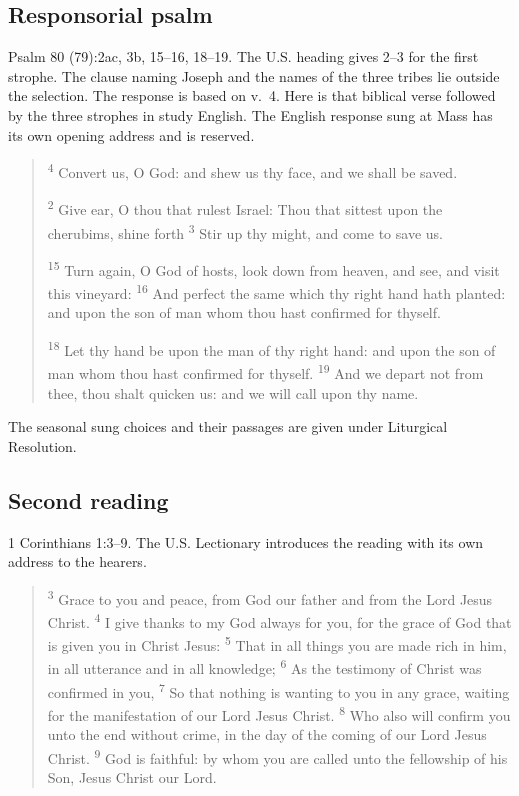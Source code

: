 \subsection{Responsorial psalm}
\label{proper-psalm}
Psalm 80 (79):2ac, 3b, 15--16, 18--19. The U.S. heading gives 2--3 for the first strophe. The clause naming Joseph and the names of the three tribes lie outside the selection. The response is based on v.~4. Here is that biblical verse followed by the three strophes in study English. The English response sung at Mass has its own opening address and is reserved.
\begin{quote}
\textsuperscript{4} Convert us, O God: and shew us thy face, and we shall be saved.

\textsuperscript{2} Give ear, O thou that rulest Israel: Thou that sittest upon the cherubims, shine forth
\textsuperscript{3} Stir up thy might, and come to save us.

\textsuperscript{15} Turn again, O God of hosts, look down from heaven, and see, and visit this vineyard:
\textsuperscript{16} And perfect the same which thy right hand hath planted: and upon the son of man whom thou hast confirmed for thyself.

\textsuperscript{18} Let thy hand be upon the man of thy right hand: and upon the son of man whom thou hast confirmed for thyself.
\textsuperscript{19} And we depart not from thee, thou shalt quicken us: and we will call upon thy name.
\end{quote}
The seasonal sung choices and their passages are given under Liturgical Resolution.

\subsection{Second reading}
\label{proper-second-reading}
1 Corinthians 1:3--9. The U.S. Lectionary introduces the reading with its own address to the hearers.
\begin{quote}
\textsuperscript{3} Grace to you and peace, from God our father and from the Lord Jesus Christ.
\textsuperscript{4} I give thanks to my God always for you, for the grace of God that is given you in Christ Jesus:
\textsuperscript{5} That in all things you are made rich in him, in all utterance and in all knowledge;
\textsuperscript{6} As the testimony of Christ was confirmed in you,
\textsuperscript{7} So that nothing is wanting to you in any grace, waiting for the manifestation of our Lord Jesus Christ.
\textsuperscript{8} Who also will confirm you unto the end without crime, in the day of the coming of our Lord Jesus Christ.
\textsuperscript{9} God is faithful: by whom you are called unto the fellowship of his Son, Jesus Christ our Lord.
\end{quote}

